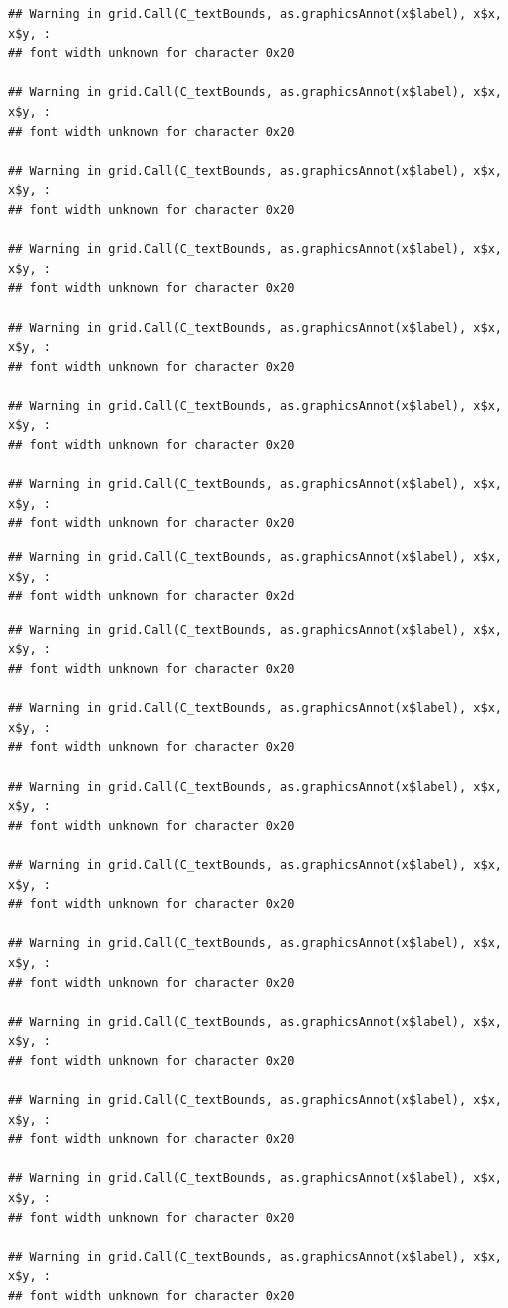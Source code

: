 \documentclass[]{article}
\theoremstyle{definition}
\theoremstyle{definition}
\theoremstyle{definition}
\theoremstyle{remark}
\begin{document}
\begin{verbatim}
## Warning in grid.Call(C_textBounds, as.graphicsAnnot(x$label), x$x, x$y, :
## font width unknown for character 0x20

## Warning in grid.Call(C_textBounds, as.graphicsAnnot(x$label), x$x, x$y, :
## font width unknown for character 0x20

## Warning in grid.Call(C_textBounds, as.graphicsAnnot(x$label), x$x, x$y, :
## font width unknown for character 0x20

## Warning in grid.Call(C_textBounds, as.graphicsAnnot(x$label), x$x, x$y, :
## font width unknown for character 0x20

## Warning in grid.Call(C_textBounds, as.graphicsAnnot(x$label), x$x, x$y, :
## font width unknown for character 0x20

## Warning in grid.Call(C_textBounds, as.graphicsAnnot(x$label), x$x, x$y, :
## font width unknown for character 0x20

## Warning in grid.Call(C_textBounds, as.graphicsAnnot(x$label), x$x, x$y, :
## font width unknown for character 0x20
\end{verbatim}

\begin{verbatim}
## Warning in grid.Call(C_textBounds, as.graphicsAnnot(x$label), x$x, x$y, :
## font width unknown for character 0x2d
\end{verbatim}

\begin{verbatim}
## Warning in grid.Call(C_textBounds, as.graphicsAnnot(x$label), x$x, x$y, :
## font width unknown for character 0x20

## Warning in grid.Call(C_textBounds, as.graphicsAnnot(x$label), x$x, x$y, :
## font width unknown for character 0x20

## Warning in grid.Call(C_textBounds, as.graphicsAnnot(x$label), x$x, x$y, :
## font width unknown for character 0x20

## Warning in grid.Call(C_textBounds, as.graphicsAnnot(x$label), x$x, x$y, :
## font width unknown for character 0x20

## Warning in grid.Call(C_textBounds, as.graphicsAnnot(x$label), x$x, x$y, :
## font width unknown for character 0x20

## Warning in grid.Call(C_textBounds, as.graphicsAnnot(x$label), x$x, x$y, :
## font width unknown for character 0x20

## Warning in grid.Call(C_textBounds, as.graphicsAnnot(x$label), x$x, x$y, :
## font width unknown for character 0x20

## Warning in grid.Call(C_textBounds, as.graphicsAnnot(x$label), x$x, x$y, :
## font width unknown for character 0x20

## Warning in grid.Call(C_textBounds, as.graphicsAnnot(x$label), x$x, x$y, :
## font width unknown for character 0x20
\end{verbatim}
\end{document}
